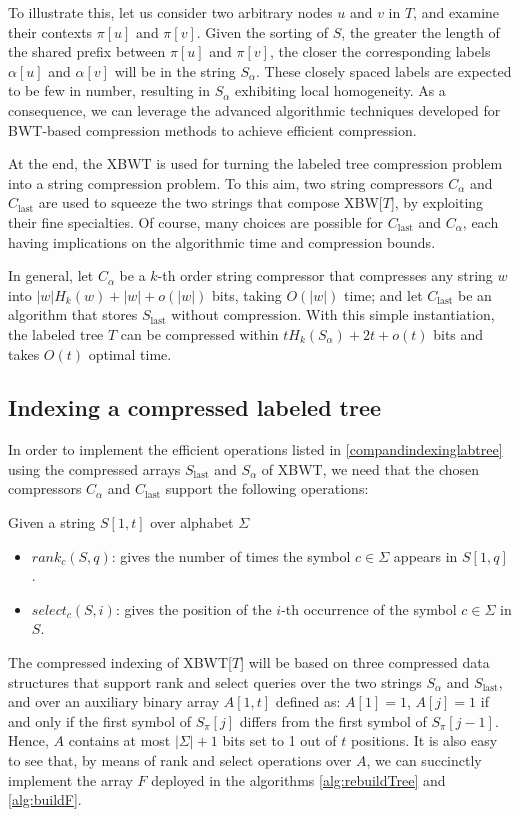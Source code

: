 To illustrate this, let us consider two arbitrary nodes $u$ and $v$ in $T$, and examine their contexts $\pi[u]$ and $\pi[v]$. Given the sorting of $S$, the greater the length of the shared prefix between $\pi[u]$ and $\pi[v]$, the closer the corresponding labels $\alpha[u]$ and $\alpha[v]$ will be in the string $S_{\alpha}$. These closely spaced labels are expected to be few in number, resulting in $S_{\alpha}$ exhibiting local homogeneity. As a consequence, we can leverage the advanced algorithmic techniques developed for BWT-based compression methods to achieve efficient compression.

At the end, the XBWT is used for turning the labeled tree compression problem into a string compression problem. To this aim, two string compressors
$C_{\alpha}$ and $C_{\text{last}}$ are used to squeeze the two strings that compose XBW[$T$], by exploiting their fine specialties. Of course, many choices are possible for $C_{\text{last}}$ and $C_{\alpha}$, each having implications on the algorithmic time and compression bounds.

In general, let $C_{\alpha}$ be a $k$-th order string compressor that compresses any string $w$ into $|w|H_k(w) + |w| + o(|w|)$ bits, taking $O(|w|)$ time; and let $C_{\text{last}}$ be an algorithm that stores $S_{\text{last}}$ without compression. With this simple instantiation, the labeled tree $T$ can be compressed within $t H_k(S_{\alpha}) + 2t + o(t)$ bits and takes $O(t)$ optimal time.

\subsection{Indexing a compressed labeled tree}
In order to implement the efficient operations listed in \ref{compandindexinglabtree} using the compressed arrays $S_{\text{last}}$ and $S_{\alpha}$ of XBWT, we need that the chosen compressors $C_{\alpha}$ and $C_{\text{last}}$ support the following operations:

Given a string $S[1, t]$ over alphabet $\Sigma$
\begin{itemize}
    \item \textbf{$rank_c(S, q)$}: gives the number of times the symbol $c \in \Sigma$ appears in $S[1, q]$.
    \item \textbf{$select_c(S, i)$}: gives the position of the $i$-th occurrence of the symbol $c \in \Sigma$ in $S$.
\end{itemize}

The compressed indexing of XBWT[$T$] will be based on three compressed data structures that support rank and select queries over the two strings $S_{\alpha}$ and $S_{\text{last}}$, and over an auxiliary binary array $A[1, t]$ defined as: $A[1] = 1$, $A[j] = 1$ if and only if the first symbol of $S_{\pi}[j]$ differs from the first symbol of $S_{\pi}[j - 1]$. Hence, $A$ contains at most $|\Sigma| + 1$ bits set to 1 out of $t$ positions. It is also easy to see that, by means of rank and select operations over $A$, we can succinctly implement the array $F$ deployed in the algorithms \ref{alg:rebuildTree} and \ref{alg:buildF}.

